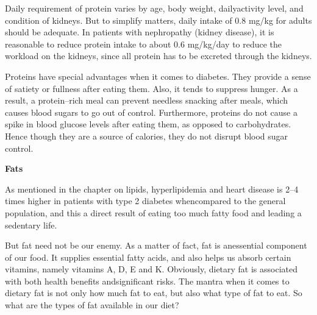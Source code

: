 Daily requirement of protein varies by age, body weight, daily\break activity level, and condition of kidneys. But to simplify matters, daily intake of 0.8 mg/kg for adults should be adequate. In patients with nephropathy (kidney disease), it is reasonable to reduce protein intake to about 0.6 mg/kg/day to reduce the workload on the kidneys, since all protein has to be excreted through the kidneys.

Proteins have special advantages when it comes to diabetes. They provide a sense of satiety or fullness after eating them. Also, it tends to suppress hunger. As a result, a protein–rich meal can prevent needless snacking after meals, which causes blood sugars to go out of control. Furthermore, proteins do not cause a spike in blood glucose levels after eating them, as opposed to carbohydrates. Hence though they are a source of calories, they do not disrupt blood sugar control.

\noindent\textbf{Fats}

As mentioned in the chapter on lipids, hyperlipidemia and heart disease is 2–4 times higher in patients with type 2 diabetes when\break compared to the general population, and this a direct result of eating too much fatty food and leading a sedentary life.

But fat need not be our enemy. As a matter of fact, fat is an\break essential component of our food. It supplies essential fatty acids, and also helps us absorb certain vitamins, namely vitamins A, D, E and K. Obviously, dietary fat is associated with both health benefits and\break significant risks. The mantra when it comes to dietary fat is not only how much fat to eat, but also what type of fat to eat. So what are the types of fat available in our diet?

\clearpage

